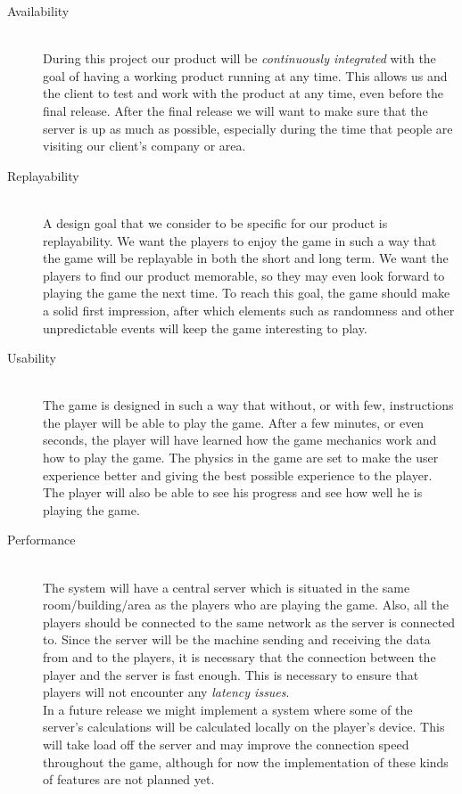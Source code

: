 \documentclass[11pt,twoside,a4paper]{article}
\begin{document}
\begin{description}
\item[Availability] \hfill \\
    During this project our product will be \emph{continuously integrated} with the goal of having a working product running at any time. This allows us and the client to test and work with the product at any time, even before the final release.
After the final release we will want to make sure that the server is up as much as possible, especially during the time that people are visiting our client's company or area. 
\item[Replayability] \hfill \\
    A design goal that we consider to be specific for our product is replayability. We want the players to enjoy the game in such a way that the game will be replayable in both the short and long term. We want the players to find our product memorable, so they may even look forward to playing the game the next time. To reach this goal, the game should make a solid first impression, after which elements such as randomness and other unpredictable events will keep the game interesting to play.
\item[Usability] \hfill \\
    The game is designed in such a way that without, or with few, instructions the player will be able to play the game. After a few minutes, or even seconds, the player will have learned how the game mechanics work and how to play the game. The physics in the game are set to make the user experience better and giving the best possible experience to the player. \\
        The player will also be able to see his progress and see how well he is playing the game.
\item[Performance] \hfill \\
    The system will have a central server which is situated in the same room/building/area as the players who are playing the game. Also, all the players should be connected to the same network as the server is connected to. Since the server will be the machine sending and receiving the data from and to the players, it is necessary that the connection between the player and the server is fast enough. This is necessary to ensure that players will not encounter any \emph{latency issues}. \\
    In a future release we might implement a system where some of the server's calculations will be calculated locally on the player's device. This will take load off the server and may improve the connection speed throughout the game, although for now the implementation of these kinds of features are not planned yet.
    
\end{description}
\end{document}
